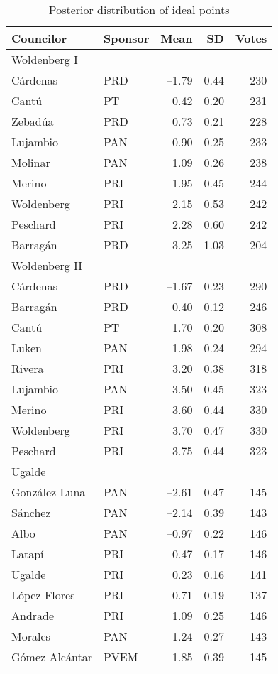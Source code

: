 \documentclass[12 pt, letter]{article}
\begin{document}
\begin{table}
\caption{Posterior distribution of ideal points}\label{T:idealpoints}
\begin{center}
\begin{tabular}{llrrr}
\hline
 Councilor   &  Sponsor  &    Mean    & SD & Votes\\ \hline
\multicolumn{5}{l}{\underline{Woldenberg I}}   \\ [1.5ex]
C\'ardenas        & PRD &--1.79  &   0.44 & 230\\
Cant\'u           & PT  &  0.42  &   0.20 & 231\\
Zebad\'ua         & PRD &  0.73  &   0.21 & 228\\
Lujambio          & PAN &  0.90  &   0.25 & 233\\
Molinar           & PAN &  1.09  &   0.26 & 238\\
Merino            & PRI &  1.95  &   0.45 & 244\\
Woldenberg        & PRI &  2.15  &   0.53 & 242\\
Peschard          & PRI &  2.28  &   0.60 & 242\\
Barrag\'an        & PRD &  3.25  &   1.03 & 204\\ [1ex]
\multicolumn{5}{l}{\underline{Woldenberg II}}  \\ [1.5ex]
C\'ardenas        & PRD &--1.67  &   0.23 & 290\\
Barrag\'an        & PRD &  0.40  &   0.12 & 246\\
Cant\'u           & PT  &  1.70  &   0.20 & 308\\
Luken             & PAN &  1.98  &   0.24 & 294\\
Rivera            & PRI &  3.20  &   0.38 & 318\\
Lujambio          & PAN &  3.50  &   0.45 & 323\\
Merino            & PRI &  3.60  &   0.44 & 330\\
Woldenberg        & PRI &  3.70  &   0.47 & 330\\
Peschard          & PRI &  3.75  &   0.44 & 323\\ [1ex]
\multicolumn{5}{l}{\underline{Ugalde}}         \\ [1.5ex]
Gonz\'alez Luna   & PAN &--2.61  &   0.47 & 145\\
S\'anchez         & PAN &--2.14  &   0.39 & 143\\
Albo              & PAN &--0.97  &   0.22 & 146\\
Latap\'i          & PRI &--0.47  &   0.17 & 146\\
Ugalde            & PRI &  0.23  &   0.16 & 141\\
L\'opez Flores    & PRI &  0.71  &   0.19 & 137\\
Andrade           & PRI &  1.09  &   0.25 & 146\\
Morales           & PAN &  1.24  &   0.27 & 143\\
G\'omez Alc\'antar& PVEM&  1.85  &   0.39 & 145\\ \hline
\end{tabular}
\end{center}
\end{table}
\end{document}
